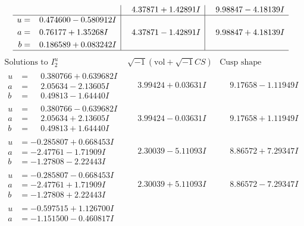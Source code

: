 \documentclass[1p]{elsarticle_modified}
\theoremstyle{definition}
\newcommand{\I}{\sqrt{-1}}
\begin{document}
$$\begin{array}{c|c|c}
 & \phantom{-}4.37871 + 1.42891 I & \phantom{-}9.98847 - 4.18139 I \\ \hline\begin{aligned}
u &= \phantom{-}0.474600 - 0.580912 I \\
a &= \phantom{-}0.76177 + 1.35268 I \\
b &= \phantom{-}0.186589 + 0.083242 I\end{aligned}
 & \phantom{-}4.37871 - 1.42891 I & \phantom{-}9.98847 + 4.18139 I\\
 \hline 
 \end{array}$$\newpage$$\begin{array}{c|c|c}  
\text{Solutions to }I^u_{2}& \I (\text{vol} + \sqrt{-1}CS) & \text{Cusp shape}\\
 \hline 
\begin{aligned}
u &= \phantom{-}0.380766 + 0.639682 I \\
a &= \phantom{-}2.05634 - 2.13605 I \\
b &= \phantom{-}0.49813 - 1.64440 I\end{aligned}
 & \phantom{-}3.99424 + 0.03631 I & \phantom{-}9.17658 - 1.11949 I \\ \hline\begin{aligned}
u &= \phantom{-}0.380766 - 0.639682 I \\
a &= \phantom{-}2.05634 + 2.13605 I \\
b &= \phantom{-}0.49813 + 1.64440 I\end{aligned}
 & \phantom{-}3.99424 - 0.03631 I & \phantom{-}9.17658 + 1.11949 I \\ \hline\begin{aligned}
u &= -0.285807 + 0.668453 I \\
a &= -2.47761 - 1.71909 I \\
b &= -1.27808 - 2.22443 I\end{aligned}
 & \phantom{-}2.30039 - 5.11093 I & \phantom{-}8.86572 + 7.29347 I \\ \hline\begin{aligned}
u &= -0.285807 - 0.668453 I \\
a &= -2.47761 + 1.71909 I \\
b &= -1.27808 + 2.22443 I\end{aligned}
 & \phantom{-}2.30039 + 5.11093 I & \phantom{-}8.86572 - 7.29347 I \\ \hline\begin{aligned}
u &= -0.597515 + 1.126700 I \\
a &= -1.151500 - 0.460817 I \\

\end{aligned}
\end{array}$$
\end{document}
